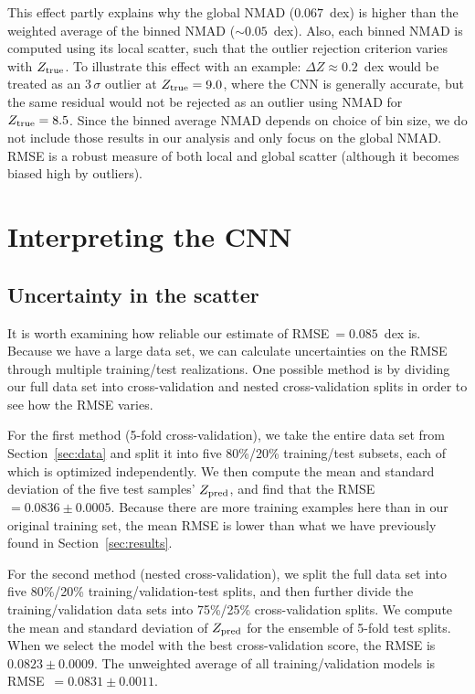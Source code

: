 \documentclass[fleqn,usenatbib]{mnras}
\begin{document}
This effect partly explains why the global NMAD ($0.067$~dex) is higher than the weighted average of the binned NMAD ($\sim 0.05$~dex). Also, each binned NMAD is computed using its local scatter, such that the outlier rejection criterion varies with $Z_{\rm true}$. To illustrate this effect with an example: $\Delta Z \approx 0.2$~dex would be treated as an $3\,\sigma$ outlier at $Z_{\rm true} = 9.0$, where the CNN is generally accurate, but the same residual would not be rejected as an outlier using NMAD for $Z_{\rm true} = 8.5$. Since the binned average NMAD depends on choice of bin size, we do not include those results in our analysis and only focus on the global NMAD. RMSE is a robust measure of both local and global scatter (although it becomes biased high by outliers).


\section{Interpreting the CNN} \label{sec:interpretation}

\subsection{Uncertainty in the scatter} \label{sec:scatter-uncertainties}

It is worth examining how reliable our estimate of RMSE$~=0.085$~dex is. Because we have a large data set, we can calculate uncertainties on the RMSE through multiple training/test realizations. 
One possible method is by dividing our full data set into cross-validation and nested cross-validation splits in order to see how the RMSE varies.

For the first method (5-fold cross-validation), we take the entire data set from Section~\ref{sec:data} and split it into five 80\%/20\% training/test subsets, each of which is optimized independently. We then compute the mean and standard deviation of the five test samples' $Z_{\rm pred}$, and find that the RMSE~$= 0.0836 \pm 0.0005$. Because there are more training examples here than in our original training set, the mean RMSE is lower than what we have previously found in Section~\ref{sec:results}.


For the second method (nested cross-validation), we split the full data set into five 80\%/20\% training/validation-test splits, and then further divide the training/validation data sets into 75\%/25\% cross-validation splits. We compute the mean and standard deviation of $Z_{\rm pred}$ for the ensemble of 5-fold test splits. When we select the model with the best cross-validation score, the RMSE is $0.0823 \pm 0.0009$. The unweighted average of all training/validation models is RMSE~$=0.0831 \pm 0.0011$.
\end{document}

